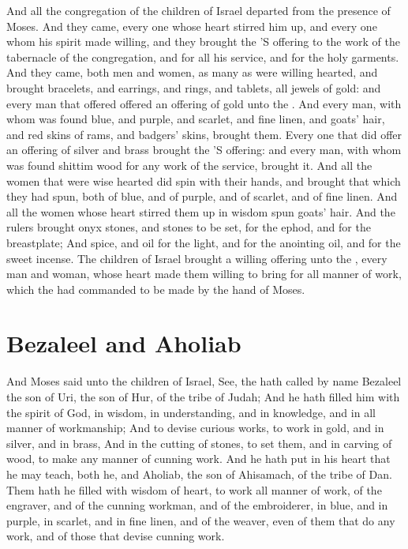 \begin{biblechapter}
\verse And all the congregation of the children of Israel departed from the presence of Moses.
\verse And they came, every one whose heart stirred him up, and every one whom his spirit made willing, and they brought the \LORD'S offering to the work of the tabernacle of the congregation, and for all his service, and for the holy garments.
\verse And they came, both men and women, as many as were willing hearted, and brought bracelets, and earrings, and rings, and tablets, all jewels of gold: and every man that offered offered an offering of gold unto the \LORD.
\verse And every man, with whom was found blue, and purple, and scarlet, and fine linen, and goats' hair, and red skins of rams, and badgers' skins, brought them.
\verse Every one that did offer an offering of silver and brass brought the \LORD'S offering: and every man, with whom was found shittim wood for any work of the service, brought it.
\verse And all the women that were wise hearted did spin with their hands, and brought that which they had spun, both of blue, and of purple, and of scarlet, and of fine linen.
\verse And all the women whose heart stirred them up in wisdom spun goats' hair.
\verse And the rulers brought onyx stones, and stones to be set, for the ephod, and for the breastplate;
\verse And spice, and oil for the light, and for the anointing oil, and for the sweet incense.
\verse The children of Israel brought a willing offering unto the \LORD, every man and woman, whose heart made them willing to bring for all manner of work, which the \LORD had commanded to be made by the hand of Moses.
\section*{Bezaleel and Aholiab}
\verse And Moses said unto the children of Israel, See, the \LORD hath called by name Bezaleel the son of Uri, the son of Hur, of the tribe of Judah;
\verse And he hath filled him with the spirit of God, in wisdom, in understanding, and in knowledge, and in all manner of workmanship;
\verse And to devise curious works, to work in gold, and in silver, and in brass,
\verse And in the cutting of stones, to set them, and in carving of wood, to make any manner of cunning work.
\verse And he hath put in his heart that he may teach, both he, and Aholiab, the son of Ahisamach, of the tribe of Dan.
\verse Them hath he filled with wisdom of heart, to work all manner of work, of the engraver, and of the cunning workman, and of the embroiderer, in blue, and in purple, in scarlet, and in fine linen, and of the weaver, even of them that do any work, and of those that devise cunning work.
\end{biblechapter}


